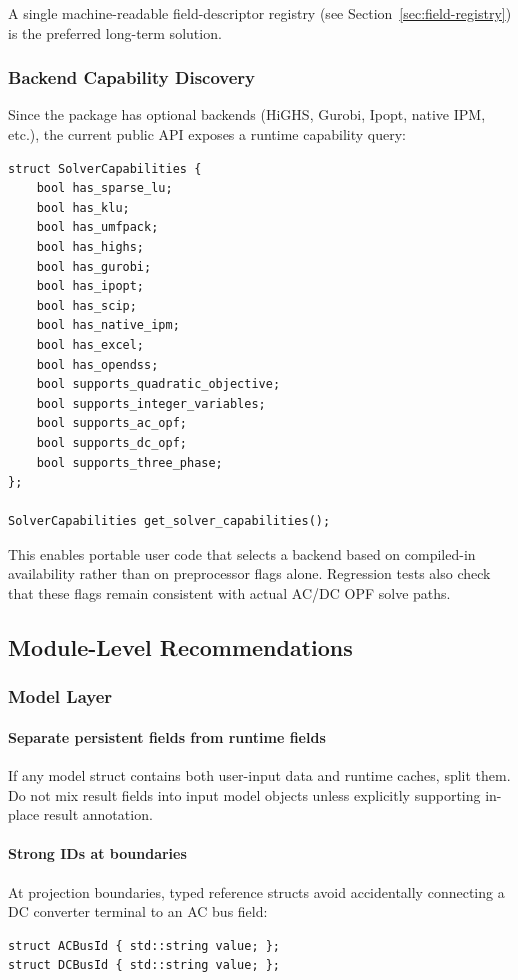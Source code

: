 A single machine-readable field-descriptor registry
(see Section~\ref{sec:field-registry}) is the preferred long-term solution.

\subsubsection{Backend Capability Discovery}

Since the package has optional backends (HiGHS, Gurobi, Ipopt, native IPM,
etc.), the current public API exposes a runtime capability query:

\begin{verbatim}
struct SolverCapabilities {
    bool has_sparse_lu;
    bool has_klu;
    bool has_umfpack;
    bool has_highs;
    bool has_gurobi;
    bool has_ipopt;
    bool has_scip;
    bool has_native_ipm;
    bool has_excel;
    bool has_opendss;
    bool supports_quadratic_objective;
    bool supports_integer_variables;
    bool supports_ac_opf;
    bool supports_dc_opf;
    bool supports_three_phase;
};

SolverCapabilities get_solver_capabilities();
\end{verbatim}

This enables portable user code that selects a backend based on compiled-in
availability rather than on preprocessor flags alone.  Regression tests also
check that these flags remain consistent with actual AC/DC OPF solve paths.

\subsection{Module-Level Recommendations}
\label{sec:module-recommendations}

\subsubsection{Model Layer}

\paragraph{Separate persistent fields from runtime fields}
If any model struct contains both user-input data and runtime caches, split
them.  Do not mix result fields into input model objects unless explicitly
supporting in-place result annotation.

\paragraph{Strong IDs at boundaries}
At projection boundaries, typed reference structs avoid accidentally
connecting a DC converter terminal to an AC bus field:
\begin{verbatim}
struct ACBusId { std::string value; };
struct DCBusId { std::string value; };
\end{verbatim}

